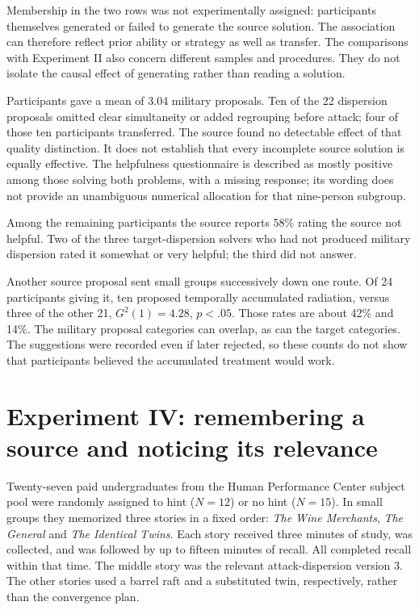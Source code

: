 Membership in the two rows was not experimentally
assigned: participants themselves generated or failed
to generate the source solution. The association can
therefore reflect prior ability or strategy as well
as transfer. The comparisons with Experiment II
also concern different samples and procedures.
They do not isolate the causal effect of generating
rather than reading a solution.

Participants gave a mean of 3.04 military proposals.
Ten of the 22 dispersion proposals omitted clear
simultaneity or added regrouping before attack;
four of those ten participants transferred.
The source found no detectable effect of that
quality distinction. It does not establish that
every incomplete source solution is equally effective.
The helpfulness questionnaire is described as mostly
positive among those solving both problems, with
a missing response; its wording does not provide an
unambiguous numerical allocation for that nine-person
subgroup.

Among the remaining participants the source reports
58\% rating the source not helpful. Two of the
three target-dispersion solvers who had not produced
military dispersion rated it somewhat or very helpful;
the third did not answer.

Another source proposal sent small groups successively
down one route. Of 24 participants giving it, ten
proposed temporally accumulated radiation, versus
three of the other 21, \(G^2(1)=4.28\), \(p<.05\).
Those rates are about 42\% and 14\%.
The military proposal categories can overlap, as can
the target categories. The suggestions were recorded
even if later rejected, so these counts do not show
that participants believed the accumulated treatment
would work.

\section{Experiment IV: remembering a source and noticing its relevance}
\label{sec:p19-analogy-experiment-four}

Twenty-seven paid undergraduates from the Human
Performance Center subject pool were randomly assigned
to hint (\(N=12\)) or no hint (\(N=15\)).
In small groups they memorized three stories in a
fixed order: \emph{The Wine Merchants}, \emph{The General}
and \emph{The Identical Twins}. Each story received
three minutes of study, was collected, and was
followed by up to fifteen minutes of recall.
All completed recall within that time. The middle
story was the relevant attack-dispersion version 3.
The other stories used a barrel raft and a substituted
twin, respectively, rather than the convergence plan.

